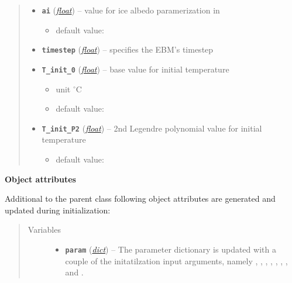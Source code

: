\documentclass[letterpaper,10pt,english]{sphinxmanual}
\begin{document}
\begin{fulllineitems}
\begin{quote}
\begin{description}
\begin{itemize}
\item {} 
\textbf{\texttt{ai}} (\href{http://docs.python.org/2.7/library/functions.html\#float}{\emph{float}}) -- 
value for ice albedo paramerization in
{\hyperref[api/climlab.surface:climlab.surface.albedo.StepFunctionAlbedo]{\emph{}}}
\begin{itemize}
\item {} 
default value: 

\end{itemize}


\item {} 
\textbf{\texttt{timestep}} (\href{http://docs.python.org/2.7/library/functions.html\#float}{\emph{float}}) -- specifies the EBM's timestep

\item {} 
\textbf{\texttt{T\_init\_0}} (\href{http://docs.python.org/2.7/library/functions.html\#float}{\emph{float}}) -- 
base value for initial temperature
\begin{itemize}
\item {} 
unit \(^{\circ} \textrm{C}\)

\item {} 
default value: 

\end{itemize}


\item {} 
\textbf{\texttt{T\_init\_P2}} (\href{http://docs.python.org/2.7/library/functions.html\#float}{\emph{float}}) -- 
2nd Legendre polynomial value for initial temperature
\begin{itemize}
\item {} 
default value: 

\end{itemize}


\end{itemize}

\end{description}\end{quote}

\textbf{Object attributes}

Additional to the parent class {\hyperref[api/climlab.process:climlab.process.energy_budget.EnergyBudget]{\emph{}}}
following object attributes are generated and updated during initialization:
\begin{quote}\begin{description}
\item[{Variables}] \leavevmode\begin{itemize}
\item {} 
\textbf{\texttt{param}} (\href{http://docs.python.org/2.7/library/stdtypes.html\#dict}{\emph{dict}}) -- The parameter dictionary is updated with a couple 
of the initatilzation input arguments, namely
, , , , , 
, ,  and .


\end{itemize}
\end{description}
\end{quote}
\end{fulllineitems}
\end{document}
